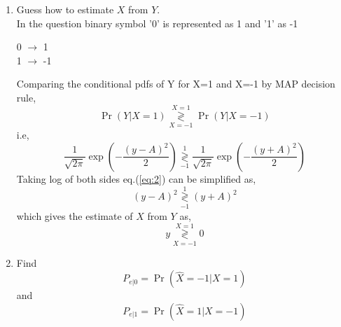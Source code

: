 \documentclass[journal,12pt,twocolumn]{IEEEtran}
\providecommand{\pr}[1]{\ensuremath{\Pr\left(#1\right)}}
\providecommand{\brak}[1]{\ensuremath{\left(#1\right)}}
\providecommand{\dec}[2]{\ensuremath{\overset{#1}{\underset{#2}{\gtrless}}}}
\begin{document}
\begin{enumerate}
\item Guess how to estimate $X$ from $Y$.
\\
In the question binary symbol '0' is represented as 1 and '1'  as -1
\begin{center}
0 $\longrightarrow$ 1\\
1 $\longrightarrow$ -1\\
\end{center}
Comparing the conditional pdfs of Y for X=1 and X=-1 by MAP decision rule,\\
\begin{equation}
\pr{Y | X=1} \dec{X=1}{X=-1} \pr{Y | X=-1}
\end{equation}
i.e, 
\begin{equation}
\frac{1}{\sqrt{2\pi}}\exp\brak{-\frac{(y-A)^2}{2}} \dec{1}{-1} \frac{1}{\sqrt{2\pi}}\exp\brak{-\frac{(y+A)^2}{2}}    \label{eq:2}
\end{equation}
Taking log of both sides  eq.(\ref{eq:2}) can be simplified as,
\begin{equation}
\brak{y-A}^2 \dec{1}{-1} \brak{y+A}^2 
\end{equation}
which gives the estimate of $X$ from $Y$ as,
\begin{equation}
y \dec{X=1}{X=-1} 0                  \label{eq:4}
\end{equation}
\item Find 
\begin{equation}
	P_{e|0} = \pr{\hat{X} = -1|X=1} \nonumber
\end{equation}
and 
\begin{equation}
	P_{e|1} = \pr{\hat{X} = 1|X=-1}   \nonumber
\end{equation}


\end{enumerate}
\end{document}
